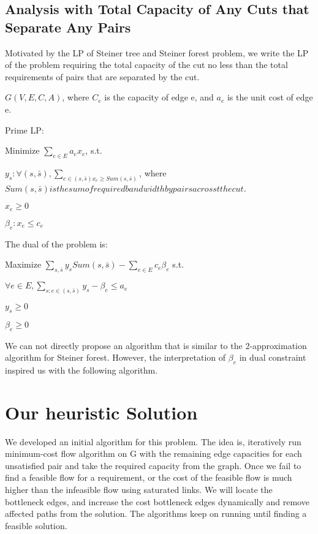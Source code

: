 \documentclass[a4paper]{article}
\begin{document}
\subsection{Analysis with Total Capacity of Any Cuts that Separate Any Pairs}
Motivated by the LP of Steiner tree and Steiner forest problem, we write the LP of the problem requiring the total capacity of the cut no less than the total requirements of pairs that are separated by the cut.

$G(V,E,C,A)$, where $C_e$ is the capacity of edge e, and $a_e$ is the unit cost of edge e. 

Prime LP:

Minimize $\sum_{e\in E}a_e x_e$, s.t.

$y_s: \forall (s,\bar{s}), \sum_{e\in (s,\bar{s})x_e\geq Sum(s,\bar{s})}$, where $Sum(s,\bar{s}) is the sum of required bandwidth by pairs acrosst the cut$.

$x_e\geq 0$

$\beta_e: x_e\leq c_e$

The dual of the problem is:

Maximize $\sum_{s,\bar{s}}y_sSum(s,\bar{s})-\sum_{e\in E}c_e \beta_e$ s.t.

$\forall e\in E, \sum_{s:e\in (s,\bar{s})}y_s-\beta_e\leq a_e$

$y_s\geq 0$

$\beta_e\geq 0$

We can not directly propose an algorithm that is similar to the 2-approximation algorithm for Steiner forest. However, the interpretation of $\beta_e$ in dual constraint inspired us with the following algorithm.




\section{Our heuristic Solution}
We developed an initial algorithm for this problem. The idea is, iteratively run minimum-cost flow algorithm on G with the remaining edge capacities for each unsatisfied pair and take the required capacity from the graph. Once we fail to find a feasible flow for a requirement, or the cost of the feasible flow is much higher than the infeasible flow using saturated links. We will locate the bottleneck edges, and increase the cost bottleneck edges dynamically and remove affected paths from the solution. The algorithms keep on running until finding a feasible solution.
\end{document}
